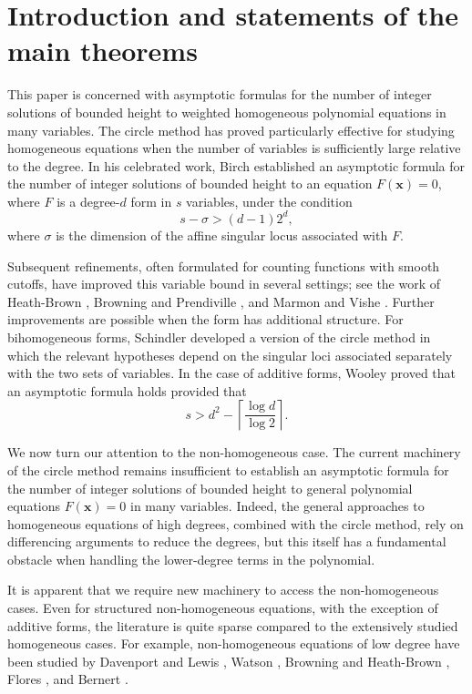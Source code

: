 \documentclass[12pt,reqno]{amsart}
\theoremstyle{definition}
\theoremstyle{remark}
\numberwithin{equation}{section}
\def\bfx{{\mathbf x}}
\begin{document}
\section{Introduction and statements of the main theorems}



This paper is concerned with asymptotic formulas for the number of integer
solutions of bounded height to weighted homogeneous polynomial equations in
many variables.  The circle method has proved particularly effective for
studying homogeneous equations when the number of variables is sufficiently
large relative to the degree.  In his celebrated work, Birch
\cite{Birch1962} established an asymptotic formula for the number of
integer solutions of bounded height to an equation $F(\bfx)=0$, where $F$ is a
degree-$d$ form in $s$ variables, under the condition
\[
    s-\sigma>(d-1)2^d,
\]
where $\sigma$ is the dimension of the affine singular locus associated
with $F$.  

Subsequent refinements, often formulated for counting functions
with smooth cutoffs, have improved this variable bound in several settings;
see the work of Heath-Brown \cite{MR703978,MR1421949}, Browning and
Prendiville \cite{Browning2017}, and Marmon and Vishe \cite{Marmon2019}.
Further improvements are possible when the form has additional structure.
For bihomogeneous forms, Schindler \cite{Schindler2014,Schindler2016}
developed a version of the circle method in which the relevant hypotheses
depend on the singular loci associated separately with the two sets of
variables. In the case of additive forms, Wooley
\cite[Theorem 1.3]{Wooley2012} proved that an asymptotic formula holds
provided that
\[
    s>d^2-\left\lceil\frac{\log d}{\log 2}\right\rceil.
\]

We now turn our attention to the non-homogeneous case. The current machinery of 
the circle method remains insufficient to establish an asymptotic formula for the 
number of integer solutions of bounded height to general polynomial equations $F(\bfx)=0$ 
in many variables. Indeed, the general approaches to homogeneous equations of high degrees, 
combined with the circle method, rely on differencing arguments to reduce the degrees, 
but this itself has a fundamental obstacle when handling the lower-degree terms in the 
polynomial. 

It is apparent that we require new machinery to access the non-homogeneous 
cases. Even for structured non-homogeneous equations, with the exception of additive 
forms, the literature is quite sparse compared to the extensively studied homogeneous 
cases. For example, non-homogeneous equations of low degree have been studied by Davenport and Lewis
\cite{DavenportLewis1964}, Watson \cite{Watson1967}, Browning and Heath-Brown
\cite{BrowningHeathBrown2009}, Flores \cite{Flores2024}, and Bernert \cite{Bernert2023}.
\end{document}
